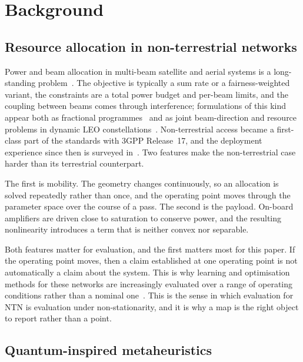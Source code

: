 \documentclass[runningheads]{llncs}
\begin{document}
\section{Background}
\label{sec:background}

\subsection{Resource allocation in non-terrestrial networks}

Power and beam allocation in multi-beam satellite and aerial systems is a long-standing
problem~\cite{ntnsurvey}. The objective is typically a sum rate or a fairness-weighted variant,
the constraints are a total power budget and per-beam limits, and the coupling between beams
comes through interference; formulations of this kind appear both as fractional
programmes~ and as joint beam-direction and resource problems in dynamic LEO
constellations~\cite{ntnbeam}. Non-terrestrial access became a first-class part of the
standards with 3GPP Release~17, and the deployment experience since then is
surveyed in~\cite{ntnroad}. Two features make the non-terrestrial case harder than its
terrestrial counterpart.

The first is mobility. The geometry changes continuously, so an allocation is solved repeatedly
rather than once, and the operating point moves through the parameter space over the course of a
pass. The second is the payload. On-board amplifiers are driven close to saturation to conserve
power, and the resulting nonlinearity introduces a term that is neither convex nor separable.

Both features matter for evaluation, and the first matters most for this paper. If the operating
point moves, then a claim established at one operating point is not automatically a claim about
the system. This is why learning and optimisation methods for these networks are increasingly
evaluated over a range of operating conditions rather than a nominal one~\cite{ntnsurvey}. This is the sense in which evaluation for NTN is evaluation under non-stationarity,
and it is why a map is the right object to report rather than a point.

\subsection{Quantum-inspired metaheuristics}
\end{document}
